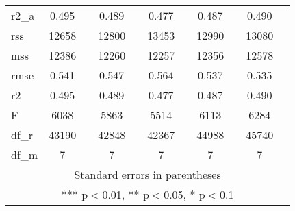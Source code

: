 \documentclass[]{article}
\begin{document}
\begin{tabular}{lcccccccccc}
r2\_a & 0.495 &  & 0.489 &  & 0.477 &  & 0.487 &  & 0.490 &  \\
rss & 12658 &  & 12800 &  & 13453 &  & 12990 &  & 13080 &  \\
mss & 12386 &  & 12260 &  & 12257 &  & 12356 &  & 12578 &  \\
rmse & 0.541 &  & 0.547 &  & 0.564 &  & 0.537 &  & 0.535 &  \\
r2 & 0.495 &  & 0.489 &  & 0.477 &  & 0.487 &  & 0.490 &  \\
F & 6038 &  & 5863 &  & 5514 &  & 6113 &  & 6284 &  \\
df\_r & 43190 &  & 42848 &  & 42367 &  & 44988 &  & 45740 &  \\
 df\_m & 7 &  & 7 &  & 7 &  & 7 &  & 7 &  \\ \hline
\multicolumn{11}{c}{ Standard errors in parentheses} \\
\multicolumn{11}{c}{ *** p$<$0.01, ** p$<$0.05, * p$<$0.1} \\
\end{tabular}
\end{document}
